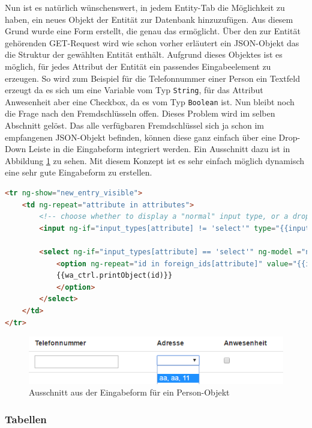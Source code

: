 Nun ist es natürlich wünschenswert, in jedem Entity-Tab die Möglichkeit zu haben, ein neues Objekt der Entität zur Datenbank hinzuzufügen. Aus diesem Grund wurde eine Form erstellt, die genau das ermöglicht. Über den zur Entität gehörenden GET-Request wird wie schon vorher erläutert ein JSON-Objekt das die Struktur der gewählten Entität enthält. Aufgrund dieses Objektes ist es möglich, für jedes Attribut der Entität ein passendes Eingabeelement zu erzeugen. So wird zum Beispiel für die Telefonnummer einer Person ein Textfeld erzeugt da es sich um eine Variable vom Typ \verb|String|, für das Attribut Anwesenheit aber eine Checkbox, da es vom Typ \verb|Boolean| ist. Nun bleibt noch die Frage nach den Fremdschlüsseln offen. Dieses Problem wird im selben Abschnitt gelöst. Das alle verfügbaren Fremdschlüssel sich ja schon im empfangenen JSON-Objekt befinden, können diese ganz einfach über eine Drop-Down Leiste in die Eingabeform integriert werden. Ein Ausschnitt dazu ist in Abbildung \ref{fig:input_form} zu sehen. Mit diesem Konzept ist es sehr einfach möglich dynamisch eine sehr gute Eingabeform zu erstellen.

\scriptsize
\begin{lstlisting}[caption=Erstellung der Eingabeform in index.html, label=cs:input_form, language=HTML]
<tr ng-show="new_entry_visible">
	<td ng-repeat="attribute in attributes">
		<!-- choose whether to display a "normal" input type, or a dropdown-list-->
		<input ng-if="input_types[attribute] != 'select'" type="{{input_types[attribute]}}" name="{{attribute}}" ng-model="new_db_object[attribute]" />
		
		<select ng-if="input_types[attribute] == 'select'" ng-model ="new_db_object[attribute]">
			<option ng-repeat="id in foreign_ids[attribute]" value="{{id}}">
			{{wa_ctrl.printObject(id)}}
			</option>
		</select>
	</td>
</tr>
\end{lstlisting}
\normalsize 

\begin{figure}[h]
\centering
\includegraphics[width=0.7\linewidth]{4_frontend/pics/input_form}
\caption{Ausschnitt aus der Eingabeform für ein Person-Objekt}
\label{fig:input_form}
\end{figure}


\subsubsection{Tabellen}

